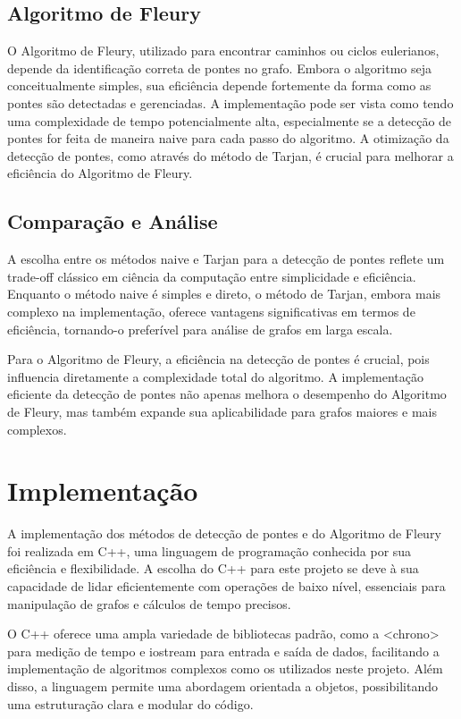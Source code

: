 \documentclass[12pt]{article}
\begin{document}
\subsection{Algoritmo de Fleury}
O Algoritmo de Fleury, utilizado para encontrar caminhos ou ciclos eulerianos, depende da identificação correta de pontes no grafo. Embora o algoritmo seja conceitualmente simples, sua eficiência depende fortemente da forma como as pontes são detectadas e gerenciadas. A implementação pode ser vista como tendo uma complexidade de tempo potencialmente alta, especialmente se a detecção de pontes for feita de maneira naive para cada passo do algoritmo. A otimização da detecção de pontes, como através do método de Tarjan, é crucial para melhorar a eficiência do Algoritmo de Fleury.

\subsection{Comparação e Análise}
A escolha entre os métodos naive e Tarjan para a detecção de pontes reflete um trade-off clássico em ciência da computação entre simplicidade e eficiência. Enquanto o método naive é simples e direto, o método de Tarjan, embora mais complexo na implementação, oferece vantagens significativas em termos de eficiência, tornando-o preferível para análise de grafos em larga escala.

Para o Algoritmo de Fleury, a eficiência na detecção de pontes é crucial, pois influencia diretamente a complexidade total do algoritmo. A implementação eficiente da detecção de pontes não apenas melhora o desempenho do Algoritmo de Fleury, mas também expande sua aplicabilidade para grafos maiores e mais complexos.


\section{Implementação}
A implementação dos métodos de detecção de pontes e do Algoritmo de Fleury foi realizada em C++, uma linguagem de programação conhecida por sua eficiência e flexibilidade. A escolha do C++ para este projeto se deve à sua capacidade de lidar eficientemente com operações de baixo nível, essenciais para manipulação de grafos e cálculos de tempo precisos.

O C++ oferece uma ampla variedade de bibliotecas padrão, como a <chrono> para medição de tempo e iostream para entrada e saída de dados, facilitando a implementação de algoritmos complexos como os utilizados neste projeto. Além disso, a linguagem permite uma abordagem orientada a objetos, possibilitando uma estruturação clara e modular do código.
\end{document}
